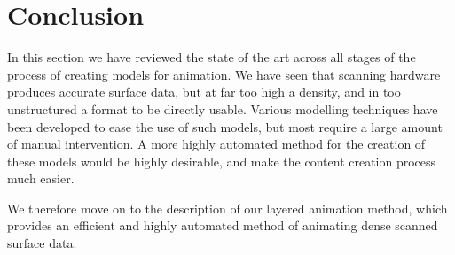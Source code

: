 \section{\label{sec:litreview:conclusion}Conclusion}

In this section we have reviewed the state of the art across all stages of the process of creating models for animation. We have seen that scanning hardware produces accurate surface data, but at far too high a density, and in too unstructured a format to be directly usable. Various modelling techniques have been developed to ease the use of such models, but most require a large amount of manual intervention. A more highly automated method for the creation of these models would be highly desirable, and make the content creation process much easier.

We therefore move on to the description of our layered animation method, which provides an efficient and highly automated method of animating dense scanned surface data.
